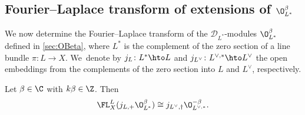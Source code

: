 \subsection{Fourier--Laplace transform of extensions of \texorpdfstring{$\O_{L^{*}}^\beta$}{O\_\{L\textasciicircum*\}\textasciicircum\textbackslash beta}}

We now determine the Fourier--Laplace transform of the $\mathscr{D}_{L^*}$\nobreakdash-mod\-ules $\O_{L^*}^\beta$ defined in \cref{sec:OBeta}, where $L^*$ is the complement of the zero section of a line bundle $\pi \colon L \to X$. We~denote by $j_L \colon L^* \hto L$ and $j_{L^\vee} \colon L^{\vee,*} \hto L^\vee$ the open embeddings from the complements of the zero section into $L$ and $L^\vee$, respectively.

\begin{prop} \label{prop:FLofObeta}
Let $\beta \in \C$ with $k\beta \in \Z$. Then
\[
\FL_X^{L}(j_{L,+} \O_{L^{*}}^{\beta}) \cong j_{L^\vee,\dag} \O_{L^{\vee,*}}^{-\beta}.
\]
\end{prop}

